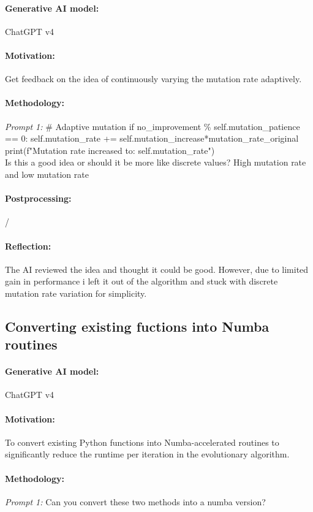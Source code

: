 \documentclass[a4paper,10pt]{article} %
\begin{document}
\paragraph{Generative AI model:} ChatGPT v4
\paragraph{Motivation:}
Get feedback on the idea of continuously varying the mutation rate adaptively.
\paragraph{Methodology:} 
\textit{Prompt 1:}
\# Adaptive mutation if no\_improvement \% self.mutation\_patience == 0: self.mutation\_rate += self.mutation\_increase*mutation\_rate\_original print(f"Mutation rate increased to: {self.mutation\_rate}")  \\
Is this a good idea or should it be more like discrete values? High mutation rate and low mutation rate

\paragraph{Postprocessing:} 
/
\paragraph{Reflection:} 
The AI reviewed the idea and thought it could be good. However, due to limited gain in performance i left it out of the algorithm and stuck with discrete mutation rate variation for simplicity.



\subsection{Converting existing fuctions into Numba routines} 
\paragraph{Generative AI model:} ChatGPT v4
\paragraph{Motivation:}
To convert existing Python functions into Numba-accelerated routines to significantly reduce the runtime per iteration in the evolutionary algorithm.

\paragraph{Methodology:} 
\textit{Prompt 1:}
Can you convert these two methods into a numba version?
\end{document}

